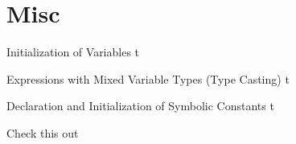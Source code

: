 \documentclass[../lecture2-variables.tex]{subfiles}
\begin{document}
\section{Misc}


\begin{frame}[fragile]{Initialization of Variables}
t
\end{frame}


\begin{frame}[fragile]{Expressions with Mixed Variable Types (Type Casting)}
t
\end{frame}


\begin{frame}[fragile]{Declaration and Initialization of Symbolic Constants}
t
\end{frame}


\begin{frame}[fragile]{Check this out}
    \begin{center}
    \end{center}
\end{frame}

\end{document}
